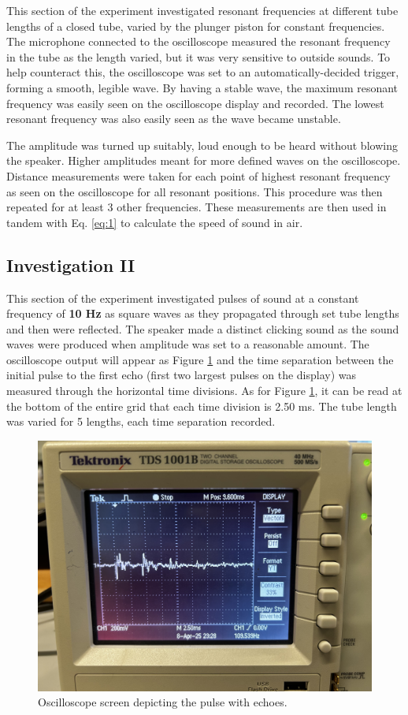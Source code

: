 \documentclass[12pt]{article}
\begin{document}
This section of the experiment investigated resonant frequencies at different tube lengths of a closed tube, varied by the plunger piston for constant frequencies.
The microphone connected to the oscilloscope measured the resonant frequency in the tube as the length varied, but it was very sensitive to outside sounds. To help counteract this, the oscilloscope was set to an automatically-decided trigger, forming a smooth, legible wave.
By having a stable wave, the maximum resonant frequency was easily seen on the oscilloscope display and recorded. The lowest resonant frequency was also easily seen as the wave became unstable.

The amplitude was turned up suitably, loud enough to be heard without blowing the speaker. Higher amplitudes meant for more defined waves on the oscilloscope. Distance measurements were taken for each point of highest resonant frequency as seen on the oscilloscope for all resonant positions.
This procedure was then repeated for at least 3 other frequencies. These measurements are then used in tandem with Eq. \ref{eq:1} to calculate the speed of sound in air.

\subsection{Investigation II}

This section of the experiment investigated pulses of sound at a constant frequency of \textbf{10 Hz} as square waves as they propagated through set tube lengths and then were reflected.
The speaker made a distinct clicking sound as the sound waves were produced when amplitude was set to a reasonable amount. The oscilloscope output will appear as Figure \ref{fig:4} and the time separation between the initial pulse to the first echo (first two largest pulses on the display) was measured through
the horizontal time divisions. As for Figure \ref{fig:4}, it can be read at the bottom of the entire grid that each time division is 2.50 ms. The tube length was varied for 5 lengths, each time separation recorded.

\begin{figure}[H]
    \centering
    \includegraphics[width=.5\linewidth]{oscil pulses.jpeg}
    \caption{Oscilloscope screen depicting the pulse with echoes.}
    \label{fig:4}
\end{figure}
\end{document}
